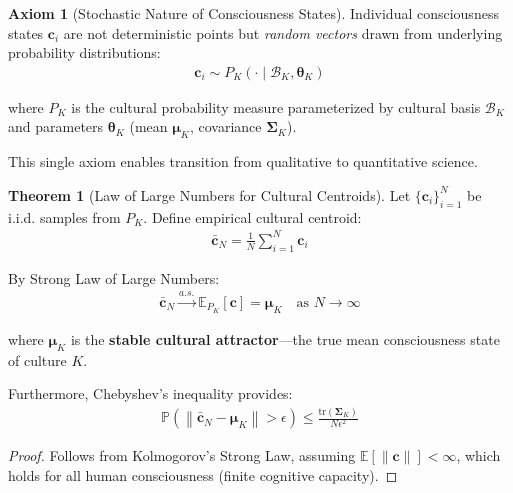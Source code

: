 \documentclass[11pt,a4paper]{article}
\theoremstyle{definition}
\newtheorem{theorem}{Theorem}[section]
\newtheorem{axiom}{Axiom}[section]
\theoremstyle{remark}
\newcommand{\cc}{\mathbf{c}}
\newcommand{\norm}[1]{\left\|#1\right\|}
\begin{document}
\begin{axiom}[Stochastic Nature of Consciousness States]
Individual consciousness states \(\cc_i\) are not deterministic points but \textit{random vectors} drawn from underlying probability distributions:
\begin{align}
\cc_i \sim P_K(\cdot \mid \mathcal{B}_K, \boldsymbol{\theta}_K)
\end{align}

where \(P_K\) is the cultural probability measure parameterized by cultural basis \(\mathcal{B}_K\) and parameters \(\boldsymbol{\theta}_K\) (mean \(\boldsymbol{\mu}_K\), covariance \(\boldsymbol{\Sigma}_K\)).
\end{axiom}

This single axiom enables transition from qualitative to quantitative science.

\begin{theorem}[Law of Large Numbers for Cultural Centroids]
Let \(\{\cc_i\}_{i=1}^N\) be i.i.d. samples from \(P_K\). Define empirical cultural centroid:
\begin{align}
\bar{\cc}_N = \frac{1}{N} \sum_{i=1}^N \cc_i
\end{align}

By Strong Law of Large Numbers:
\begin{align}
\bar{\cc}_N \xrightarrow{a.s.} \mathbb{E}_{P_K}[\cc] = \boldsymbol{\mu}_K \quad \text{as } N \to \infty
\end{align}

where \(\boldsymbol{\mu}_K\) is the \textbf{stable cultural attractor}—the true mean consciousness state of culture \(K\).

Furthermore, Chebyshev's inequality provides:
\begin{align}
\mathbb{P}\left(\norm{\bar{\cc}_N - \boldsymbol{\mu}_K} > \epsilon\right) \leq \frac{\text{tr}(\boldsymbol{\Sigma}_K)}{N\epsilon^2}
\end{align}
\end{theorem}

\begin{proof}
Follows from Kolmogorov's Strong Law, assuming \(\mathbb{E}[\norm{\cc}] < \infty\), which holds for all human consciousness (finite cognitive capacity).
\end{proof}
\end{document}
